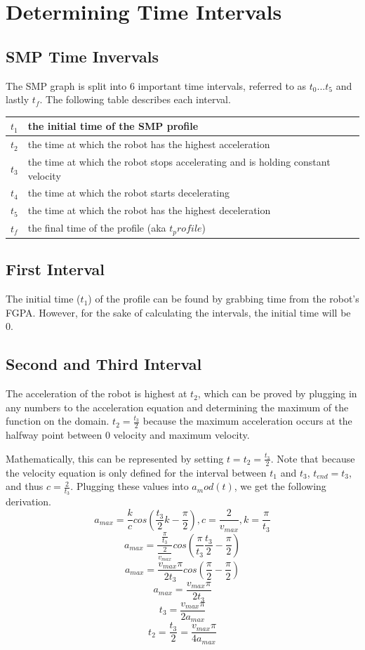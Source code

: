 \documentclass[a4paper,12pt]{report}
\newcommand{\tab}{\hspace{20pt}}
\begin{document}
	\chapter{Determining Time Intervals}
	\section{SMP Time Invervals}
	\tab The SMP graph is split into 6 important time intervals, referred to as $t_0...t_5$ and lastly $t_f$. The following table describes each interval.
	
	\begin{center}
		\begin{tabular}{| l | l |}
			\hline
			$t_1$ & the initial time of the SMP profile \\ \hline
			$t_2$ & the time at which the robot has the highest acceleration \\ \hline
			$t_3$ & the time at which the robot stops accelerating and is holding constant velocity \\ \hline
			$t_4$ & the time at which the robot starts decelerating \\ \hline
			$t_5$ & the time at which the robot has the highest deceleration \\ \hline
			$t_f$ & the final time of the profile (aka $t_profile$) \\ \hline
		\end{tabular}
	\end{center}
	
	\section{First Interval}
	\tab The initial time ($t_1$) of the profile can be found by grabbing time from the robot's FGPA. However, for the sake of calculating the intervals, the initial time will be 0.
	
	\section{Second and Third Interval}
	\tab The acceleration of the robot is highest at $t_2$, which can be proved by plugging in any numbers to the acceleration equation and determining the maximum of the function on the domain. $t_2 = \frac{t_3}{2}$ because the maximum acceleration occurs at the halfway point between 0 velocity and maximum velocity.
	
	\tab Mathematically, this can be represented by setting $t = t_2 = \frac{t_3}{2}$. Note that because the velocity equation is only defined for the interval between $t_1$ and $t_3$, $t_{end} = t_3$, and thus $c = \frac{2}{t_3}$. Plugging these values into $a_mod(t)$, we get the following derivation.
	\[a_{max} = \frac{k}{c} cos(\frac{t_3}{2} k - \frac{\pi}{2}), c = \frac{2}{v_{max}}, k = \frac{\pi}{t_{3}}\]
	\[a_{max} = \frac{\frac{\pi}{t_3}}{\frac{2}{v_{max}}} cos(\frac{\pi}{t_3} \frac{t_3}{2} - \frac{\pi}{2})\]
	\[a_{max} = \frac{v_{max}\pi}{2t_3} cos(\frac{\pi}{2} - \frac{\pi}{2})\]
	\[a_{max} = \frac{v_{max}\pi}{2t_3}\]
	\[t_3 = \frac{v_{max}\pi}{2a_{max}}\]
	\[t_2 = \frac{t_3}{2} = \frac{v_{max}\pi}{4a_{max}}\]
	
\end{document}
